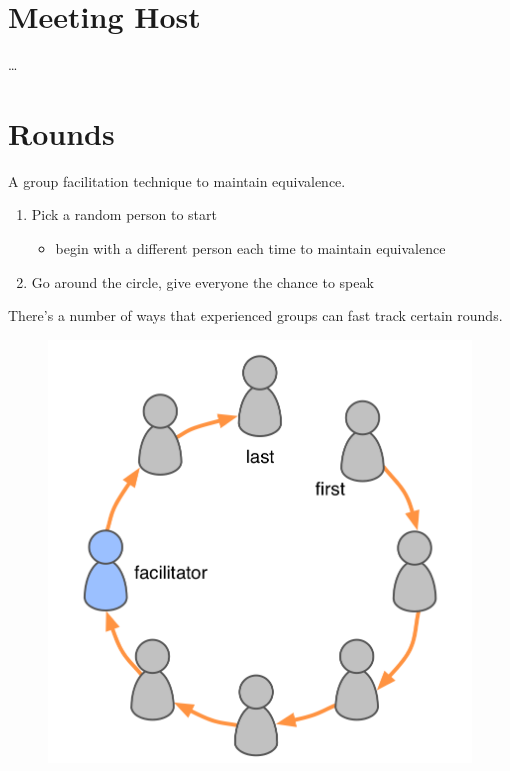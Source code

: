 \section{Meeting Host}
\label{meetinghost}

{\ldots}

\section{Rounds}
\label{rounds}

A group facilitation technique to maintain equivalence.

\begin{enumerate}
\item Pick a random person to start

\begin{itemize}
\item begin with a different person each time to maintain equivalence

\end{itemize}

\item Go around the circle, give everyone the chance to speak

\end{enumerate}

There's a number of ways that experienced groups can fast track certain rounds.

\begin{figure}[htbp]
\centering
\includegraphics[keepaspectratio,width=\textwidth,height=0.75\textheight]{img/circle/rounds.png}
\end{figure}

